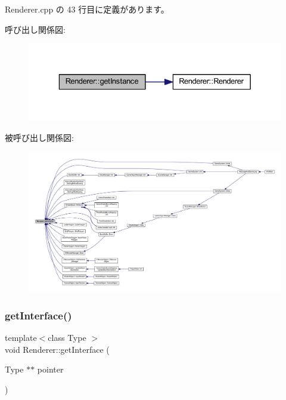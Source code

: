  Renderer.\+cpp の 43 行目に定義があります。

呼び出し関係図\+:
\nopagebreak
\begin{figure}[H]
\begin{center}
\leavevmode
\includegraphics[width=329pt]{class_renderer_ac1bf10ff8b4f967f0d416a26d482abd6_cgraph}
\end{center}
\end{figure}
被呼び出し関係図\+:
\nopagebreak
\begin{figure}[H]
\begin{center}
\leavevmode
\includegraphics[width=350pt]{class_renderer_ac1bf10ff8b4f967f0d416a26d482abd6_icgraph}
\end{center}
\end{figure}
\mbox{\label{class_renderer_a6e77556825755be3db8a5a734460e66f}} 
\subsubsection{\texorpdfstring{get\+Interface()}{getInterface()}}
{\footnotesize\ttfamily template$<$class Type $>$ \\
void Renderer\+::get\+Interface (\begin{DoxyParamCaption}\item[{Type $\ast$$\ast$}]{pointer }\end{DoxyParamCaption})\hspace{0.3cm}{\ttfamily [inline]}}



